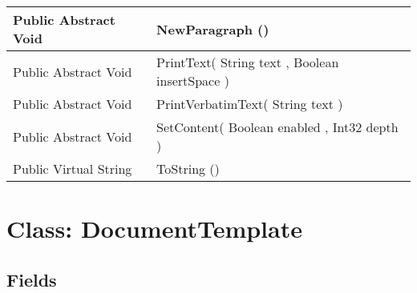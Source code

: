 \documentclass[11pt, oneside, a4paper]{book}
\begin{document}
\begin{center}
\begin{tabular}{| p{3cm} | p{12cm} | }
\hline
 Public  Abstract  Void &  NewParagraph ()\hypertarget{SoftwareEngineeringTools.{}Documentation.{}DocumentGenerator.{}NewParagraph}{}\\
\hline
 Public  Abstract  Void &  PrintText(\hypertarget{SoftwareEngineeringTools.{}Documentation.{}DocumentGenerator.{}PrintText\_String\_Boolean}{} String  text  ,  Boolean  insertSpace  )\\
\hline
 Public  Abstract  Void &  PrintVerbatimText(\hypertarget{SoftwareEngineeringTools.{}Documentation.{}DocumentGenerator.{}PrintVerbatimText\_String}{} String  text  )\\
\hline
 Public  Abstract  Void &  SetContent(\hypertarget{SoftwareEngineeringTools.{}Documentation.{}DocumentGenerator.{}SetContent\_Boolean\_Int32}{} Boolean  enabled  ,  Int32  depth  )\\
\hline
 Public  Virtual  String &  ToString ()\hypertarget{SoftwareEngineeringTools.{}Documentation.{}DocumentGenerator.{}ToString}{}\\
\hline
\end{tabular}
\end{center}
 


\hypertarget{SoftwareEngineeringTools.{}Documentation.{}DocumentTemplate}{}
\section{Class: DocumentTemplate}

\subsection{Fields}
\end{document}

